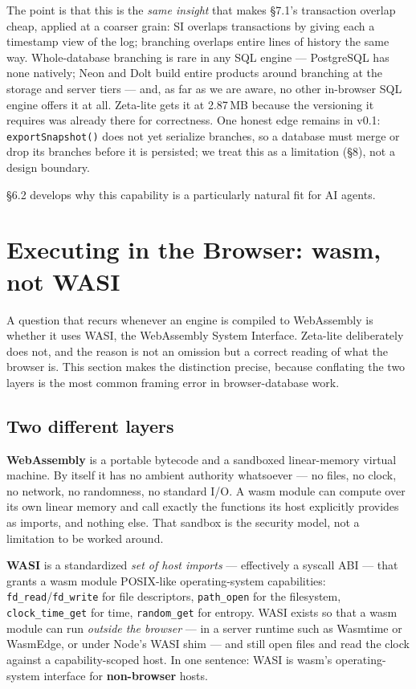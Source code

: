 \documentclass[11pt]{article}
\begin{document}
The point is that this is the \emph{same insight} that makes \S7.1's transaction
overlap cheap, applied at a coarser grain: SI overlaps transactions by giving each a
timestamp view of the log; branching overlaps entire lines of history the same way.
Whole-database branching is rare in any SQL engine --- PostgreSQL has none natively;
Neon and Dolt build entire products around branching at the storage and server
tiers --- and, as far as we are aware, no other in-browser SQL engine offers it at
all. Zeta-lite gets it at 2.87\,MB because the versioning it requires was already
there for correctness. One honest edge remains in v0.1: \texttt{exportSnapshot()}
does not yet serialize branches, so a database must merge or drop its branches
before it is persisted; we treat this as a limitation (\S8), not a design boundary.

\S6.2 develops why this capability is a particularly natural fit for AI agents.

\section{Executing in the Browser: wasm, not WASI}

A question that recurs whenever an engine is compiled to WebAssembly is whether it
uses WASI, the WebAssembly System Interface. Zeta-lite deliberately does not, and
the reason is not an omission but a correct reading of what the browser is. This
section makes the distinction precise, because conflating the two layers is the most
common framing error in browser-database work.

\subsection{Two different layers}

\textbf{WebAssembly} is a portable bytecode and a sandboxed linear-memory virtual
machine. By itself it has no ambient authority whatsoever --- no files, no clock, no
network, no randomness, no standard I/O. A wasm module can compute over its own
linear memory and call exactly the functions its host explicitly provides as
imports, and nothing else. That sandbox is the security model, not a limitation to
be worked around.

\textbf{WASI} is a standardized \emph{set of host imports} --- effectively a syscall
ABI --- that grants a wasm module POSIX-like operating-system capabilities:
\texttt{fd\_read}/\texttt{fd\_write} for file descriptors, \texttt{path\_open} for
the filesystem, \texttt{clock\_time\_get} for time, \texttt{random\_get} for
entropy. WASI exists so that a wasm module can run \emph{outside the browser} --- in
a server runtime such as Wasmtime or WasmEdge, or under Node's WASI shim --- and
still open files and read the clock against a capability-scoped host. In one
sentence: WASI is wasm's operating-system interface for \textbf{non-browser} hosts.
\end{document}
